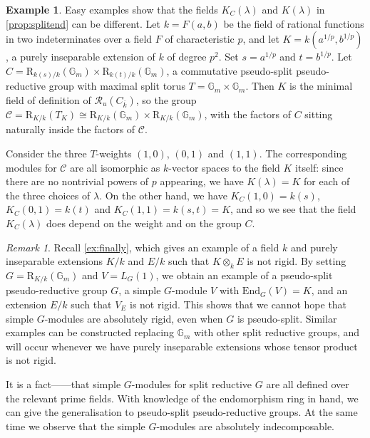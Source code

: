 \documentclass[11pt,reqno]{amsart}
\theoremstyle{definition}
\newtheorem{example}[lemma]{Example}
\theoremstyle{remark}
\newtheorem{remark}[lemma]{Remark}
\theoremstyle{definition}
\theoremstyle{plain}
\newcommand{\R}{\mathrm{R}}
\newcommand{\RR}{\mathscr{R}}
\newcommand{\End}{\mathrm{End}}
\newcommand{\Gm}{\mathbb{G}_m}
\newcommand{\C}{\mathscr{C}}
\newcommand{\bark}{{\overline{k}}}
\begin{document}
\begin{example}\label{ex:klambda}
Easy examples show that the fields $K_C(\lambda)$ and $K(\lambda)$ in \cref{prop:splitend} can be different.
Let $k = F(a,b)$ be the field of rational functions in two indeterminates over a field $F$ of characteristic $p$,
and let $K = k(a^{1/p},b^{1/p})$, a purely inseparable extension of $k$ of degree $p^2$.
Set $s = a^{1/p}$ and $t=b^{1/p}$.
Let $C = \R_{k(s)/k}(\Gm)\times \R_{k(t)/k}(\Gm)$, a commutative pseudo-split pseudo-reductive group with maximal split torus $T=\Gm\times\Gm$.
Then $K$ is the minimal field of definition of $\RR_u(C_\bark)$, so the group $\C = \R_{K/k}(T_K) \cong \R_{K/k}(\Gm)\times \R_{K/k}(\Gm)$,
with the factors of $C$ sitting naturally inside the factors of $\C$.

Consider the three $T$-weights $(1,0)$, $(0,1)$ and $(1,1)$.
The corresponding modules for $\C$ are all isomorphic as $k$-vector spaces to the field $K$ itself: since there are no nontrivial powers of $p$ appearing, we have $K(\lambda) = K$ for each of the three choices of $\lambda$.
On the other hand, we have $K_C(1,0) = k(s)$, $K_C(0,1) = k(t)$ and $K_C(1,1) = k(s,t) = K$,
and so we see that the field $K_C(\lambda)$ does depend on the weight and on the group $C$.
\end{example}




\begin{remark}\label{rem:finally}
Recall \cref{ex:finally}, which gives an example of a field $k$ and purely inseparable extensions $K/k$ and $E/k$ such that $K\otimes_k E$ is not rigid.
By setting $G = \R_{K/k}(\Gm)$ and $V = L_G(1)$, we obtain an example of a pseudo-split pseudo-reductive group $G$, a simple $G$-module $V$ with $\End_G(V) = K$, 
and an extension $E/k$ such that $V_E$ is not rigid.
This shows that we cannot hope that simple $G$-modules are absolutely rigid, even when $G$ is pseudo-split. 
Similar examples can be constructed replacing $\Gm$ with other split reductive groups, 
and will occur whenever we have purely inseparable extensions whose tensor product is not rigid.
\end{remark}

It is a fact---\!\!\cite[II.2.9]{Jan03}---that simple $G$-modules for split reductive $G$ are all defined over the relevant prime fields. With knowledge of the endomorphism ring in hand, we can give the generalisation to pseudo-split pseudo-reductive groups. 
At the same time we observe that the simple $G$-modules are absolutely indecomposable.
\end{document}
